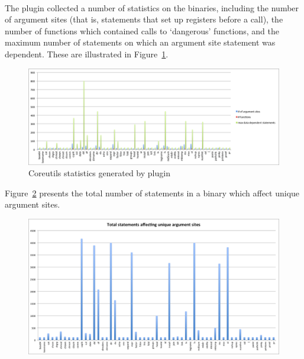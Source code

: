 \documentclass[letterpaper,11pt]{article}
\begin{document}
\paragraph{}
The plugin collected a number of statistics on the binaries, including
the number of argument sites (that is, statements that set up registers
before a call), the number of functions which contained calls to `dangerous'
functions, and the maximum number of statements on which an argument
site statement was dependent. These are illustrated in Figure~\ref{fig:corestats}.

\begin{figure}[ht!]
\centering
\includegraphics[scale=0.55, trim=0mm 0mm 0mm 0mm, clip]{img/coreutils2.pdf}
\caption{Coreutils statistics generated by plugin}
\label{fig:corestats}
\end{figure}

Figure~\ref{fig:coretotal} presents the total number of statements in a binary
which affect unique argument sites.

\begin{figure}[ht!]
\centering
\includegraphics[scale=0.45, trim=0mm 0mm 0mm 0mm, clip]{img/coreutilstotal.pdf}
\label{fig:coretotal}
\end{figure}
\end{document}
